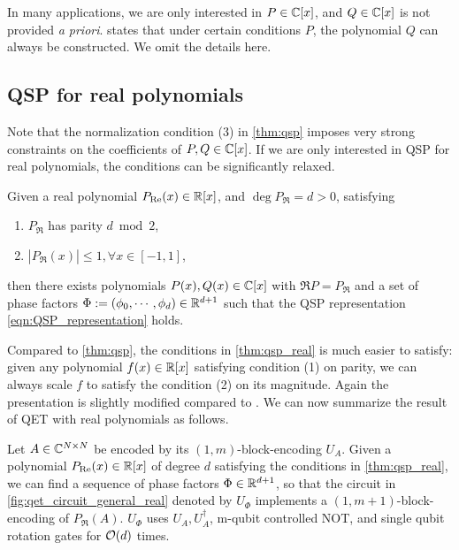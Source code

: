 \begin{rem}
In many applications, we are only interested in $P\in\mathbb{C}[x]$, and $Q\in\mathbb{C}[x]$ is not provided \emph{a priori}. \cite[Theorem 4]{GilyenSuLowEtAl2018} states that under certain conditions $P$, the polynomial $Q$ can always be constructed. We omit the details here.
\end{rem}
 


\subsection{QSP for real polynomials}

Note that the normalization condition (3) in \cref{thm:qsp} imposes very strong constraints on the coefficients of $P,Q\in\mathbb{C}[x]$.
If we are only interested in QSP for real polynomials, the conditions can be significantly relaxed.

\begin{thm}\label{thm:qsp_real}
Given a real polynomial $P_{\operatorname{Re}}(x)\in\mathbb{R}[x]$, and $\deg P_{\Re}=d>0$, satisfying
\begin{enumerate}

\item $P_{\Re}$ has parity $d \bmod 2$,

\item $|P_{\Re}(x)|\le 1, \forall x \in [-1, 1]$,
\end{enumerate}
then there exists polynomials $P(x),Q(x)\in\mathbb{C}[x]$ with $\Re P=P_{\Re}$ and a set of phase factors $\Phi := (\phi_0, \cdots, \phi_d) \in \mathbb{R}^{d+1}$ such that the QSP representation \cref{eqn:QSP_representation} holds.
\end{thm}

Compared to \cref{thm:qsp}, the conditions in \cref{thm:qsp_real} is much easier to satisfy: given any polynomial $f(x)\in\mathbb{R}[x]$ satisfying condition (1) on parity, we can always scale $f$ to satisfy the condition (2) on its magnitude.
Again the presentation is slightly modified compared to \cite[Corollary 5]{GilyenSuLowEtAl2019}.
We can now summarize the result of QET with real polynomials as follows.

\begin{cor}
Let $A\in\mathbb{C}^{N\times N}$ be encoded by its $(1,m)$-block-encoding $U_A$.
Given a polynomial $P_{\operatorname{Re}}(x)\in\mathbb{R}[x]$ of degree $d$ satisfying the conditions in \cref{thm:qsp_real}, we can find a sequence of phase factors $\Phi\in\mathbb{R}^{d+1}$, so that the circuit in \cref{fig:qet_circuit_general_real} denoted by $U_{\Phi}$ implements a $(1,m+1)$-block-encoding of $P_{\Re}(A)$.
$U_{\Phi}$ uses $U_A,U_A^{\dag}$, m-qubit controlled NOT, and single qubit rotation gates for $\mathcal{O}(d)$ times.
\label{cor:qet_real}
\end{cor}


